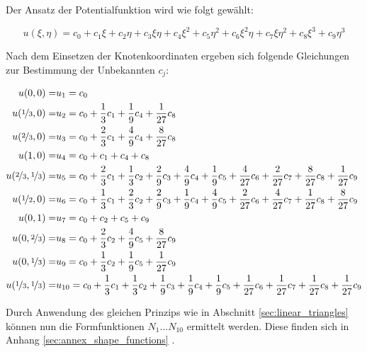 Der Ansatz der Potentialfunktion wird wie folgt gewählt:

\begin{equation}
\label{eq:cubic_triangle_eq}
u(\xi, \eta) = c_0 + c_1 \xi + c_2 \eta + c_3 \xi \eta + c_4 \xi^2 + c_5 \eta^2 + c_6 \xi^2 \eta + c_7 \xi \eta^2 + c_8 \xi^3 + c_9 \eta^3
\end{equation}	



Nach dem Einsetzen der Knotenkoordinaten ergeben sich folgende Gleichungen zur Bestimmung der Unbekannten $c_j$:\newline

\begin{align}
u(0,0) = &u_1 = c_0\\
u(\nicefrac{1}{3}, 0) = &u_2 = c_0 + \frac{1}{3} c_1 + \frac{1}{9} c_4 +  \frac{1}{27} c_8\nonumber \\
u(\nicefrac{2}{3}, 0) = &u_3 = c_0 + \frac{2}{3} c_1 + \frac{4}{9} c_4 +  \frac{8}{27} c_8\nonumber \\
u(1,0) = &u_4 = c_0 + c_1 + c_4 + c_8\nonumber\\
u(\nicefrac{2}{3}, \nicefrac{1}{3}) = &u_5 = c_0 + \frac{2}{3} c_1 +  \frac{1}{3} c_2 + \frac{2}{9} c_3 +  \frac{4}{9} c_4 + \frac{1}{9} c_5 + \frac{4}{27} c_6 + \frac{2}{27} c_7 + \frac{8}{27} c_8 + \frac{1}{27} c_9\nonumber\\
u(\nicefrac{1}{2}, 0) = &u_6 = c_0 + \frac{1}{3} c_1 +  \frac{2}{3} c_2 + \frac{2}{9} c_3 +  \frac{1}{9} c_4 + \frac{4}{9} c_5 + \frac{2}{27} c_6 + \frac{4}{27} c_7 + \frac{1}{27} c_8 + \frac{8}{27} c_9\nonumber\\
u(0,1) = &u_7 = c_0 + c_2 + c_5 + c_9\nonumber\\
u(0, \nicefrac{2}{3}) = &u_8 = c_0 + \frac{2}{3} c_2 + \frac{4}{9} c_5 +  \frac{8}{27} c_9\nonumber \\
u(0, \nicefrac{1}{3}) = &u_9 = c_0 + \frac{1}{3} c_2 + \frac{1}{9} c_5 +  \frac{1}{27} c_9\nonumber \\
u(\nicefrac{1}{3}, \nicefrac{1}{3}) = &u_{10} = c_0 + \frac{1}{3} c_1 +  \frac{1}{3} c_2 + \frac{1}{9} c_3 +  \frac{1}{9} c_4 + \frac{1}{9} c_5 + \frac{1}{27} c_6 + \frac{1}{27} c_7 + \frac{1}{27} c_8 + \frac{1}{27} c_9\nonumber
\end{align}	
	

Durch Anwendung des gleichen Prinzips wie in Abschnitt \ref{sec:linear_triangles} können nun die Formfunktionen $N_1 \text{...} N_10$ ermittelt werden. Diese finden sich in Anhang \ref{sec:annex_shape_functions} .